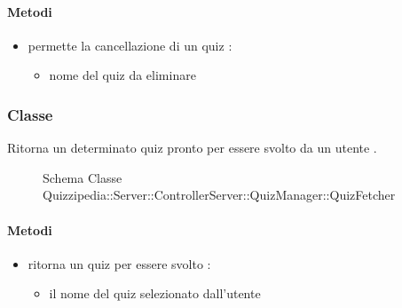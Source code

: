 \paragraph{Metodi}
\begin{itemize}
\item {}
\newline
permette la cancellazione di un quiz
\newline
{} :
\begin{itemize}
\item {}
\newline
nome del quiz da eliminare
\end{itemize}
\end{itemize}
\subsubsection{Classe }
Ritorna un determinato quiz pronto per essere svolto da un utente .
\begin{figure}[H]
\centering
\noindent{}
\caption[Schema Classe QuizFetcher]{Schema Classe Quizzipedia::Server::ControllerServer::QuizManager::QuizFetcher}
\end{figure}
\paragraph{Metodi}
\begin{itemize}
\item {}
\newline
ritorna un quiz per essere svolto
\newline
{} :
\begin{itemize}
\item {}
\newline
il nome del quiz selezionato dall'utente
\end{itemize}
\end{itemize}
